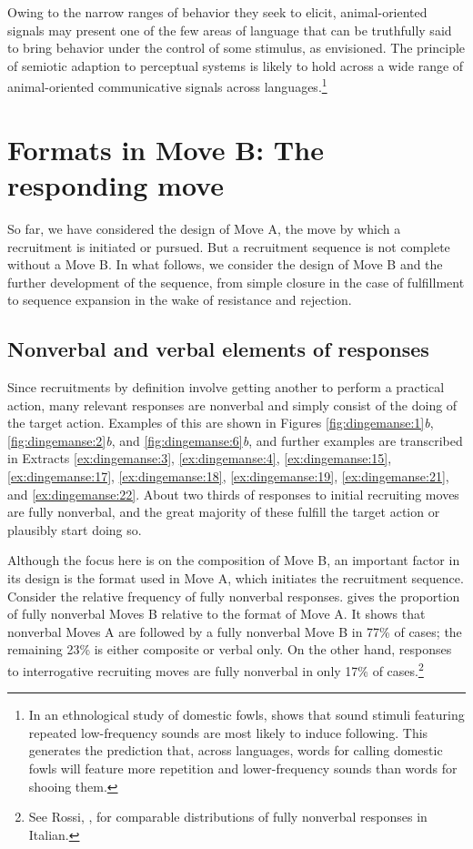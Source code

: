 \documentclass[output=paper]{langsci/langscibook}
\begin{document}
Owing to the narrow ranges of behavior they seek to elicit, animal-oriented signals may present one of the few areas of language that can be truthfully said to bring behavior under the control of some stimulus, as \cite{skinner_verbal_1957} envisioned. The principle of semiotic adaption to perceptual systems is likely to hold across a wide range of animal-oriented communicative signals across languages.\footnote{In an ethnological study of domestic fowls, \cite{fischer_sound_1972} shows that sound stimuli featuring repeated low-frequency sounds are most likely to induce following. This generates the prediction that, across languages, words for calling domestic fowls will feature more repetition and lower-frequency sounds than words for shooing them.}

\section{Formats in Move B: The responding move}

So far, we have considered the design of Move A, the move by which a recruitment is initiated or pursued. But a recruitment sequence is not complete without a Move B. In what follows, we consider the design of Move B and the further development of the sequence, from simple closure in the case of fulfillment to sequence expansion in the wake of resistance and rejection.

\subsection{Nonverbal and verbal elements of responses}\label{sec:dingemanse:4.1}

Since recruitments by definition involve getting another to perform a practical action, many relevant responses are nonverbal and simply consist of the doing of the target action. Examples of this are shown in Figures \ref{fig:dingemanse:1}\textit{b}, \ref{fig:dingemanse:2}\textit{b}, and \ref{fig:dingemanse:6}\textit{b}, and further examples are transcribed in Extracts \ref{ex:dingemanse:3},  \ref{ex:dingemanse:4},  \ref{ex:dingemanse:15},  \ref{ex:dingemanse:17},  \ref{ex:dingemanse:18},  \ref{ex:dingemanse:19},  \ref{ex:dingemanse:21}, and  \ref{ex:dingemanse:22}. About two thirds of responses to initial recruiting moves are fully nonverbal, and the great majority of these fulfill the target action or plausibly start doing so.

Although the focus here is on the composition of Move B, an important factor in its design is the format used in Move A, which initiates the recruitment sequence. Consider the relative frequency of fully nonverbal responses.  gives the proportion of fully nonverbal Moves B relative to the format of Move A. It shows that nonverbal Moves A are followed by a fully nonverbal Move B in 77\% of cases; the remaining 23\% is either composite or verbal only. On the other hand, responses to interrogative recruiting moves are fully nonverbal in only 17\% of cases.\footnote{See Rossi, ,  for comparable distributions of fully nonverbal responses in Italian.}
\end{document}
